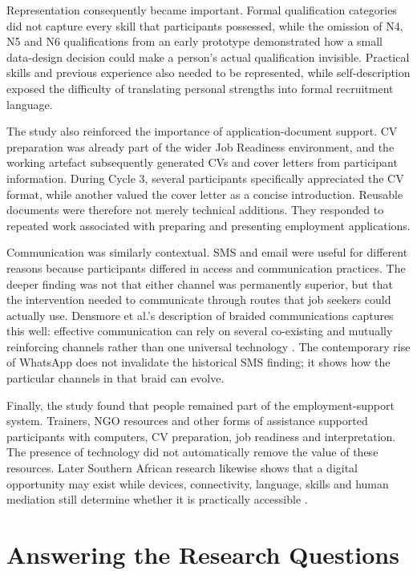 Representation consequently became important. Formal qualification categories did not capture every skill that participants possessed, while the omission of N4, N5 and N6 qualifications from an early prototype demonstrated how a small data-design decision could make a person's actual qualification invisible. Practical skills and previous experience also needed to be represented, while self-description exposed the difficulty of translating personal strengths into formal recruitment language.

The study also reinforced the importance of application-document support. CV preparation was already part of the wider Job Readiness environment, and the working artefact subsequently generated CVs and cover letters from participant information. During Cycle 3, several participants specifically appreciated the CV format, while another valued the cover letter as a concise introduction. Reusable documents were therefore not merely technical additions. They responded to repeated work associated with preparing and presenting employment applications.

Communication was similarly contextual. SMS and email were useful for different reasons because participants differed in access and communication practices. The deeper finding was not that either channel was permanently superior, but that the intervention needed to communicate through routes that job seekers could actually use. Densmore et al.'s description of braided communications captures this well: effective communication can rely on several co-existing and mutually reinforcing channels rather than one universal technology \cite{densmore2013}. The contemporary rise of WhatsApp does not invalidate the historical SMS finding; it shows how the particular channels in that braid can evolve.

Finally, the study found that people remained part of the employment-support system. Trainers, NGO resources and other forms of assistance supported participants with computers, CV preparation, job readiness and interpretation. The presence of technology did not automatically remove the value of these resources. Later Southern African research likewise shows that a digital opportunity may exist while devices, connectivity, language, skills and human mediation still determine whether it is practically accessible \cite{keskinen2022}.


\section{Answering the Research Questions}

